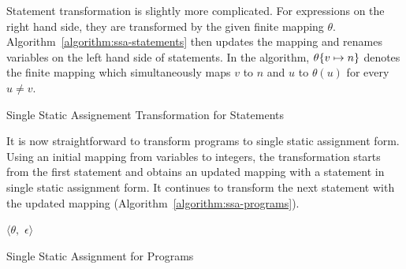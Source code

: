 Statement transformation is slightly more complicated. For
expressions on the right hand side, they are transformed by the given
finite mapping $\theta$. Algorithm~\ref{algorithm:ssa-statements} then
updates the mapping and renames variables on the left hand side of
statements. In the algorithm, $\theta\{{v} \mapsto {n}\}$
denotes the finite mapping which simultaneously maps $v$ to
$n$ and $u$ to $\theta(u)$ for every $u \neq v$.

\begin{algorithm}[ht]
  \begin{algorithmic}[1]
      \EndCase
      \EndCase
    \EndMatch
    \EndFunction
  \end{algorithmic}
  \caption{Single Static Assignement Transformation for Statements}
  \label{algorithm:ssa-statements}
\end{algorithm}

It is now straightforward to transform programs to single static
assignment form. Using an initial mapping from variables to integers,
the transformation starts from the first statement and obtains an
updated mapping with a statement in single static assignment form. It
continues to transform the next statement with the updated mapping
(Algorithm~\ref{algorithm:ssa-programs}). 

\begin{algorithm}[ht]
  \begin{algorithmic}[1]
      \Case{$\epsilon$}
        \Return $\langle \theta,$ $\epsilon \rangle$
      \EndCase
      \EndCase
    \EndMatch
    \EndFunction
  \end{algorithmic}
  \caption{Single Static Assignment for Programs}
  \label{algorithm:ssa-programs}
\end{algorithm}

